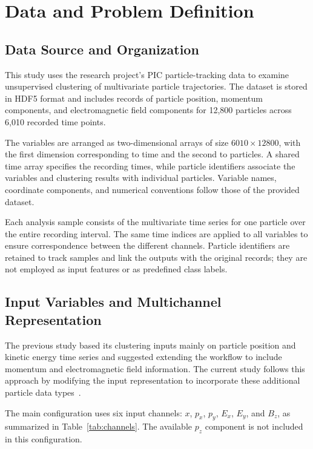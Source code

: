 \section{Data and Problem Definition}\label{sec:data}

\subsection{Data Source and Organization}

This study uses the research project's PIC particle-tracking data to examine unsupervised clustering of multivariate particle trajectories. The dataset is stored in HDF5 format and includes records of particle position, momentum components, and electromagnetic field components for 12,800 particles across 6,010 recorded time points.

The variables are arranged as two-dimensional arrays of size \(6010 \times 12800\), with the first dimension corresponding to time and the second to particles. A shared time array specifies the recording times, while particle identifiers associate the variables and clustering results with individual particles. Variable names, coordinate components, and numerical conventions follow those of the provided dataset.

Each analysis sample consists of the multivariate time series for one particle over the entire recording interval. The same time indices are applied to all variables to ensure correspondence between the different channels. Particle identifiers are retained to track samples and link the outputs with the original records; they are not employed as input features or as predefined class labels.

\subsection{Input Variables and Multichannel Representation}

The previous study based its clustering inputs mainly on particle position and kinetic energy time series and suggested extending the workflow to include momentum and electromagnetic field information. The current study follows this approach by modifying the input representation to incorporate these additional particle data types~\cite{moreiraReport}.

The main configuration uses six input channels: \(x\), \(p_x\), \(p_y\), \(E_x\), \(E_y\), and \(B_z\), as summarized in Table~\ref{tab:channels}. The available \(p_z\) component is not included in this configuration.

